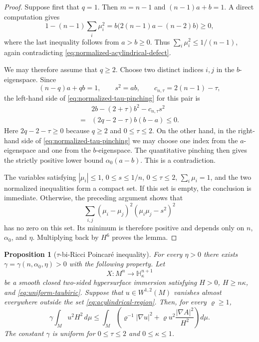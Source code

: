 \documentclass[11pt,reqno]{amsart}
\newtheorem{proposition}{Proposition}[section]
\theoremstyle{definition}
\theoremstyle{remark}
\numberwithin{equation}{section}
\newcommand{\Hh}{\mathbb H}
\begin{document}
\begin{proof}
Suppose first that $q=1$.  Then $m=n-1$ and
$(n-1)a+b=1$.  A direct computation gives
\begin{equation*}
 1-(n-1)\sum_i\mu_i^2
 =b\bigl(2(n-1)a-(n-2)b\bigr)\geq0,
\end{equation*}
where the last inequality follows from $a>b\geq0$.  Thus
$\sum_i\mu_i^2\leq1/(n-1)$, again contradicting
\eqref{eq:normalized-acylindrical-defect}.

We may therefore assume that $q\geq2$.  Choose two distinct indices
$i,j$ in the $b$-eigenspace.  Since
\begin{equation*}
 (n-q)a+qb=1,
 \qquad
 s^2=ab,
 \qquad
 c_{n,\tau}=2(n-1)-\tau,
\end{equation*}
the left-hand side of
\eqref{eq:normalized-tau-pinching} for this pair is
\begin{align*}
 &2b-(2+\tau)b^2-c_{n,\tau}s^2\\
 =&(2q-2-\tau)b(b-a)\leq0.
\end{align*}
Here $2q-2-\tau\geq0$ because $q\geq2$ and $0\leq\tau\leq2$.
On the other hand, in the right-hand side of
\eqref{eq:normalized-tau-pinching} we may choose one index from the
$a$-eigenspace and one from the $b$-eigenspace.  The quantitative pinching
then gives the strictly positive lower bound
$\alpha_0(a-b)$.  This is a contradiction.

The variables satisfying $|\mu_i|\leq1$, $0\leq s\leq1/n$,
$0\leq\tau\leq2$, $\sum_i\mu_i=1$, and the two normalized inequalities form
a compact set.  If this set is empty, the conclusion is immediate.  Otherwise,
the preceding argument shows that
\begin{equation*}
 \sum_{i,j}
 (\mu_i-\mu_j)^2(\mu_i\mu_j-s^2)^2
\end{equation*}
has no zero on this set.  Its minimum is therefore positive and depends only
on $n$, $\alpha_0$, and $\eta$.  Multiplying back by $H^6$ proves the lemma.
\end{proof}

\begin{proposition}[$\tau$-bi-Ricci Poincar\'e inequality]
\label{prop:tau-poincare}
For every $\eta>0$ there exists
$\gamma=\gamma(n,\alpha_0,\eta)>0$ with the following property.
Let
\begin{equation*}
 X:M^n\longrightarrow\Hh^{n+1}_{\kappa}
\end{equation*}
be a smooth closed two-sided hypersurface immersion satisfying
$H>0$, $H\geq n\kappa$, and \eqref{eq:uniform-taubiric}.  Suppose that
$u\in W^{1,2}(M)$ vanishes almost everywhere outside the set
\eqref{eq:acylindrical-region}.  Then, for every $\varrho\geq1$,
\begin{equation}\label{eq:tau-poincare}
 \gamma\int_Mu^2H^2\,d\mu
 \leq
 \int_M\left(
 \varrho^{-1}|\nabla u|^2
 +\varrho u^2\frac{|\nabla A|^2}{H^2}
 \right)d\mu.
\end{equation}
The constant $\gamma$ is uniform for
$0\leq\tau\leq2$ and $0\leq\kappa\leq1$.
\end{proposition}
\end{document}
